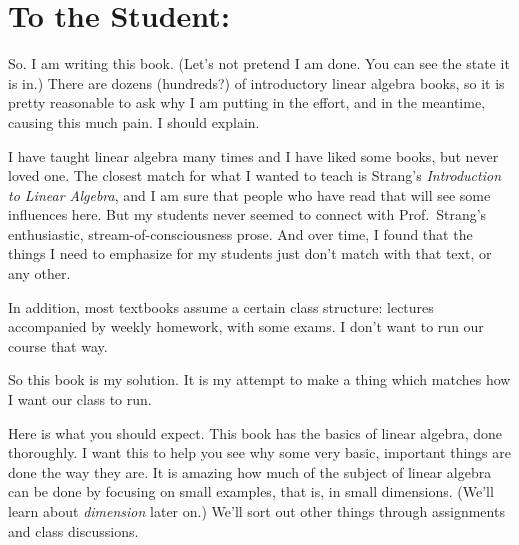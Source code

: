 \documentclass[00-livre-main]{subfiles}
\begin{document}
\chapter{To the Student:}

So. 
I am writing this book. 
(Let's not pretend I am done. 
You can see the state it is in.) 
There are dozens (hundreds?) of introductory linear algebra books, so it is pretty reasonable to ask why I am putting in the effort, and in the meantime, causing this much pain. 
I should explain.

I have taught linear algebra many times and I have liked some books, but never loved one. 
The closest match for what I wanted to teach is Strang's \emph{Introduction to Linear Algebra}, and I am sure that people who have read that will see some influences here. 
But my students never seemed to connect with Prof.~Strang's enthusiastic, stream-of-consciousness prose. 
And over time, I found that the things I need to emphasize for my students just don't match with that text, or any other.

In addition, most textbooks assume a certain class structure: lectures accompanied by weekly homework, with some exams. 
I don't want to run our course that way. 

So this book is my solution. 
It is my attempt to make a thing which matches how I want our class to run. 

Here is what you should expect. 
This book has the basics of linear algebra, done thoroughly. 
I want this to help you see why some very basic, important things are done the way they are. 
It is amazing how much of the subject of linear algebra can be done by focusing on small examples, that is, in small dimensions. 
(We'll learn about \emph{dimension} later on.) 
We'll sort out other things through assignments and class discussions.
\end{document}
